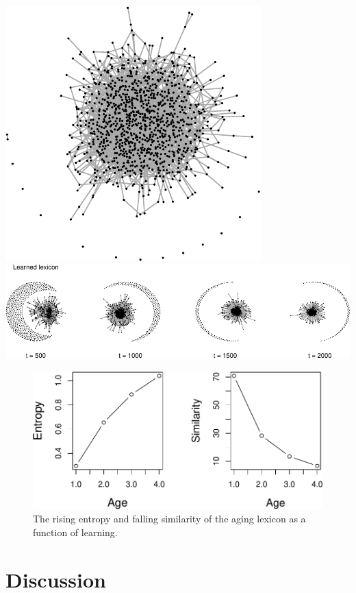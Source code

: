 \documentclass[
  man]{apa6}
\begin{document}
\includegraphics{Enrichment_files/figure-latex/sim1-1.pdf} \includegraphics{Enrichment_files/figure-latex/sim1-2.pdf}

\begin{figure}
\centering
\includegraphics{Enrichment_files/figure-latex/entropySim-1.pdf}
\caption{\label{fig:entropySim}The rising entropy and falling similarity of the aging lexicon as a function of learning.}
\end{figure}

\hypertarget{discussion}{%
\section{Discussion}\label{discussion}}
\end{document}
